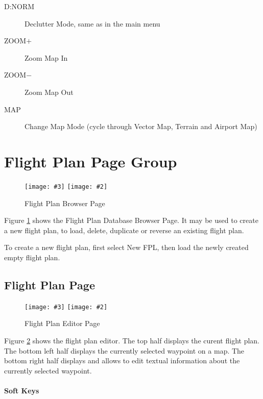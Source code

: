 \documentclass[a4paper,10pt,pdftex]{article}
\newcommand{\jnxfig}[3][]{\ifmypdf\texttt{[image: \#3]}
  \else\texttt{[image: \#2]}\fi}
\begin{document}
\begin{description}
\item[D:NORM] Declutter Mode, same as in the main menu
\item[ZOOM$+$] Zoom Map In
\item[ZOOM$-$] Zoom Map Out
\item[MAP] Change Map Mode (cycle through Vector Map, Terrain and
  Airport Map)
\end{description}

\clearpage

\section{Flight Plan Page Group}

\begin{figure}[!htbp]
  \begin{center}
    \jnxfig[scale=0.5]{fplbrowser.eps}{fplbrowser.png}
    \caption{Flight Plan Browser Page}
    \label{fig:fplbrowser}
  \end{center}
\end{figure}

Figure \ref{fig:fplbrowser} shows the Flight Plan Database Browser
Page. It may be used to create a new flight plan, to load, delete,
duplicate or reverse an existing flight plan.

To create a new flight plan, first select New FPL, then load the newly
created empty flight plan.

\subsection{Flight Plan Page}

\begin{figure}[!htbp]
  \begin{center}
    \jnxfig[scale=0.5]{fpleditor.eps}{fpleditor.png}
    \caption{Flight Plan Editor Page}
    \label{fig:fpleditor}
  \end{center}
\end{figure}

Figure \ref{fig:fpleditor} shows the flight plan editor. The top half
displays the curent flight plan. The bottom left half displays the
currently selected waypoint on a map. The bottom right half displays
and allows to edit textual information about the currently selected
waypoint.

\paragraph{Soft Keys}
\end{document}
